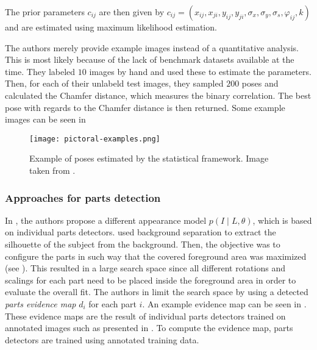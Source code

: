 The prior parameters $c_{ij}$ are then given by $c_{ij} = (x_{ij}, x_{ji}, y_{ij}, y_{ji}, \sigma_x, \sigma_y, \sigma_s, \varphi_{ij}, k)$ and are estimated using maximum likelihood estimation.

The authors merely provide example images instead of a quantitative analysis.
This is most likely because of the lack of benchmark datasets available at the time.
They labeled $10$ images by hand and used these to estimate the parameters.
Then, for each of their unlabeld test images, they sampled $200$ poses and calculated the Chamfer distance, which measures the binary correlation.
The best pose with regards to the Chamfer distance is then returned.
Some example images can be seen in 

\begin{figure}[htb!]
    \centering
    \texttt{[image: pictoral-examples.png]}
    \caption{Example of poses estimated by the statistical framework. Image taken from \cite{felzenszwalb_pictorial_2005}.}
    \label{fig:pictoral-examples}
\end{figure}

\subsubsection{Approaches for parts detection}
\label{sec:pose-andriluka}

In \cite{andriluka_pictorial_2009}, the authors propose a different appearance model $p(I \mid L, \theta)$, which is based on individual parts detectors.
\cite{felzenszwalb_pictorial_2005} used background separation to extract the silhouette of the subject from the background.
Then, the objective was to configure the parts in such way that the covered foreground area was maximized (see ).
This resulted in a large search space since all different rotations and scalings for each part need to be placed inside the foreground area in order to evaluate the overall fit.
The authors in \cite{andriluka_pictorial_2009} limit the search space by using a detected \textit{parts evidence map} $d_i$ for each part $i$.
An example evidence map can be seen in .
These evidence maps are the result of individual parts detectors trained on annotated images such as presented in .
To compute the evidence map, parts detectors are trained using annotated training data.

